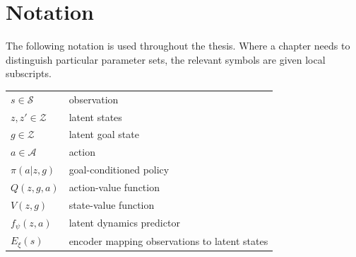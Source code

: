 \documentclass[a4paper, twoside]{report}
\begin{document}
\renewcommand{\abstractname}{Acknowledgements}
\begin{abstract}
I would first like to thank my supervisor, Christos Ziakas, who went above and beyond all expectations throughout this project. Many of the ideas in this thesis came from our brainstorming sessions, and I am extremely grateful for the time, guidance, and encouragement he gave me along the way. His enthusiasm and support helped shape the project into something I am proud of. I am also grateful to Nuri Cingillioglu for serving as second marker.

I would also like to thank my family for their love, encouragement, and support, not just during this project but throughout my entire time at Imperial. They have supported me through every challenge, celebrated every success, and helped me keep going when things felt difficult. Thank you for everything, I would not be here today without you.

I am also thankful to my friends for making my time at Imperial such a fun and memorable one. We made many great memories over the years, and got through the difficult times together. Finally, I would like to thank my girlfriend, Delilah, for listening to all my struggles and helping me stay positive. Your support, patience, and interest in what I was working on made such a difference, so thank you.
\end{abstract}

\tableofcontents

\chapter*{Notation}
\noindent
The following notation is used throughout the thesis. Where a chapter
needs to distinguish particular parameter sets, the relevant symbols are
given local subscripts.

\medskip

\noindent
\begin{tabular}{ll}
$s \in \mathcal S$ & observation \\
$z,z'\in\mathcal Z$ & latent states \\
$g\in\mathcal Z$ & latent goal state \\
$a\in\mathcal A$ & action \\
$\pi(a|z,g)$ & goal-conditioned policy \\
$Q(z,g,a)$ & action-value function \\
$V(z,g)$ & state-value function \\
$f_\psi(z,a)$ & latent dynamics predictor \\
$E_\xi(s)$ & encoder mapping observations to latent states \\
\end{tabular}
\end{document}
